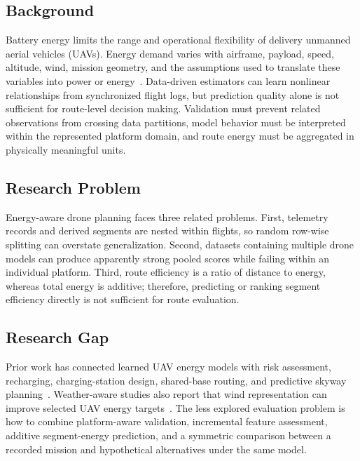 \documentclass[conference,a4paper]{IEEEtran}
\begin{document}
\subsection{Background}
Battery energy limits the range and operational flexibility of delivery unmanned aerial vehicles (UAVs). Energy demand varies with airframe, payload, speed, altitude, wind, mission geometry, and the assumptions used to translate these variables into power or energy~\cite{rodrigues2021,stolaroff2018,zhang2021,choudhry2021}. Data-driven estimators can learn nonlinear relationships from synchronized flight logs, but prediction quality alone is not sufficient for route-level decision making. Validation must prevent related observations from crossing data partitions, model behavior must be interpreted within the represented platform domain, and route energy must be aggregated in physically meaningful units.

\subsection{Research Problem}
Energy-aware drone planning faces three related problems. First, telemetry records and derived segments are nested within flights, so random row-wise splitting can overstate generalization. Second, datasets containing multiple drone models can produce apparently strong pooled scores while failing within an individual platform. Third, route efficiency is a ratio of distance to energy, whereas total energy is additive; therefore, predicting or ranking segment efficiency directly is not sufficient for route evaluation.

\subsection{Research Gap}
Prior work has connected learned UAV energy models with risk assessment, recharging, charging-station design, shared-base routing, and predictive skyway planning~\cite{choudhry2021,alyassi2023,pinto2022,meskar2024,ren2026}. Weather-aware studies also report that wind representation can improve selected UAV energy targets~\cite{somanagoudar2025,pang2026}. The less explored evaluation problem is how to combine platform-aware validation, incremental feature assessment, additive segment-energy prediction, and a symmetric comparison between a recorded mission and hypothetical alternatives under the same model.
\end{document}
